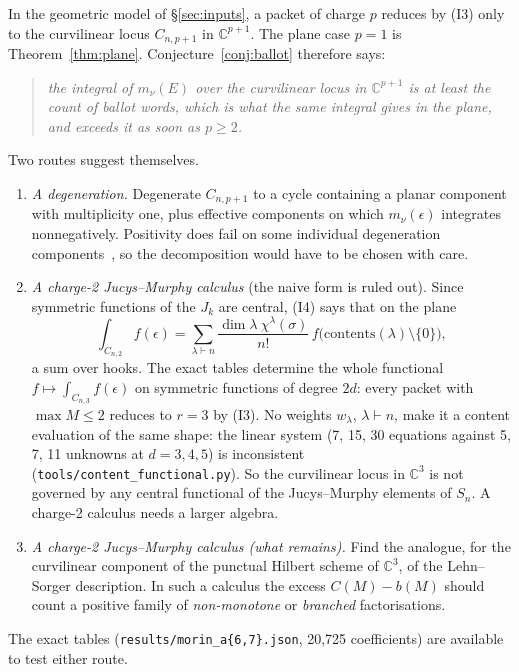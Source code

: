 \documentclass[11pt,a4paper]{article}
\theoremstyle{plain}
\theoremstyle{definition}
\theoremstyle{remark}
\begin{document}
In the geometric model of \S\ref{sec:inputs}, a packet of charge $p$ reduces by (I3) only to
the curvilinear locus $C_{n,p+1}$ in $\mathbb{C}^{p+1}$. The plane case $p = 1$ is
Theorem~\ref{thm:plane}. Conjecture~\ref{conj:ballot} therefore says:
\begin{quote}
\emph{the integral of $m_\nu(E)$ over the curvilinear locus in $\mathbb{C}^{p+1}$ is at least the
count of ballot words, which is what the same integral gives in the plane, and exceeds it as soon
as $p \ge 2$.}
\end{quote}
Two routes suggest themselves.
\begin{enumerate}[nosep]
\item \emph{A degeneration.} Degenerate $C_{n,p+1}$ to a cycle containing a planar component with
  multiplicity one, plus effective components on which $m_\nu(\epsilon)$ integrates nonnegatively.
  Positivity does fail on some individual degeneration components~\cite{FS}, so the decomposition
  would have to be chosen with care.
\item \emph{A charge-2 Jucys--Murphy calculus} (the naive form is ruled out). Since symmetric
  functions of the $J_k$ are central, (I4) says that on the plane
  \[
    \int_{C_{n,2}} f(\epsilon) = \sum_{\lambda \vdash n} \frac{\dim\lambda\ \chi^\lambda(\sigma)}{n!}\,
    f\bigl(\mathrm{contents}(\lambda) \setminus \{0\}\bigr),
  \]
  a sum over hooks. The exact tables determine the whole functional $f \mapsto \int_{C_{n,3}}
  f(\epsilon)$ on symmetric functions of degree $2d$: every packet with $\max M \le 2$ reduces to
  $r = 3$ by (I3). No weights $w_\lambda$, $\lambda \vdash n$, make it a content evaluation of the
  same shape: the linear system (7, 15, 30 equations against 5, 7, 11 unknowns at $d = 3, 4, 5$) is
  inconsistent (\texttt{tools/content\_functional.py}). So the curvilinear locus in $\mathbb{C}^3$
  is not governed by any central functional of the Jucys--Murphy elements of $S_n$. A charge-2
  calculus needs a larger algebra.
\item \emph{A charge-2 Jucys--Murphy calculus (what remains).} Find the analogue, for the curvilinear component
  of the punctual Hilbert scheme of $\mathbb{C}^3$, of the Lehn--Sorger description. In such a
  calculus the excess $C(M) - b(M)$ should count a positive family of \emph{non-monotone} or
  \emph{branched} factorisations.
\end{enumerate}
The exact tables (\texttt{results/morin\_a\{6,7\}.json}, 20,725 coefficients) are available to test
either route.
\end{document}
